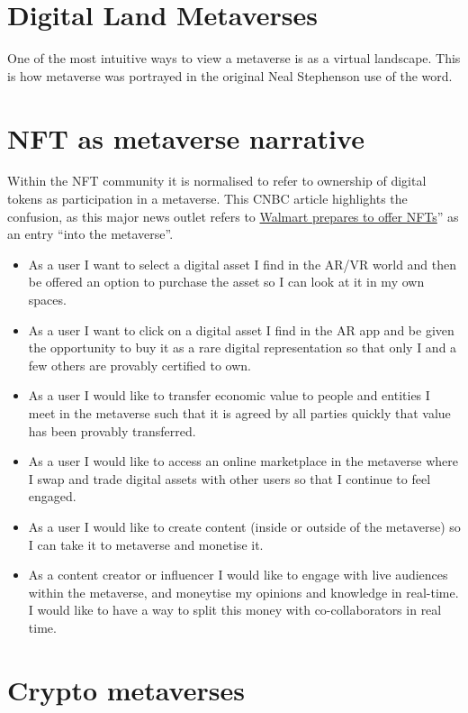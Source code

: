 \section{Digital Land Metaverses}
One of the most intuitive ways to view a metaverse is as a virtual landscape. This is how metaverse was portrayed in the original Neal Stephenson use of the word. 


\section{NFT as metaverse narrative}
Within the NFT community it is normalised to refer to ownership of digital tokens as participation in a metaverse. 
This CNBC article highlights the confusion, as this major news outlet refers to \href{https://www.cnbc.com/2022/01/16/walmart-is-quietly-preparing-to-enter-the-metaverse.html}{Walmart prepares to offer NFTs}'' as an entry ``into the metaverse''.



\label{behaviours}
\begin{itemize}
\item As a user I want to select a digital asset I find in the AR/VR world and then be offered an option to purchase the asset so I can look at it in my own spaces.
\item As a user I want to click on a digital asset I find in the AR app and be given the opportunity to buy it as a rare digital representation so that only I and a few others are provably certified to own.
\item As a user I would like to transfer economic value to people and entities I meet in the metaverse such that it is agreed by all parties quickly that value has been provably transferred.
\item As a user I would like to access an online marketplace in the metaverse where I swap and trade digital assets with other users so that I continue to feel engaged.
\item As a user I would like to create content (inside or outside of the metaverse) so I can take it to metaverse and monetise it.
\item As a content creator or influencer I would like to engage with live audiences within the metaverse, and moneytise my opinions and knowledge in real-time. I would like to have a way to split this money with co-collaborators in real time.
\end{itemize}
\section{Crypto metaverses}


